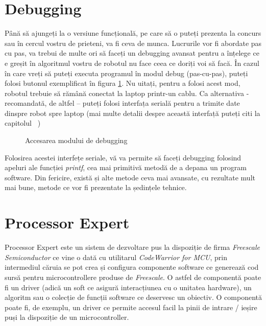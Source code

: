 \section{Debugging}

Până să ajungeți la o versiune funcțională, pe care să o puteți prezenta la concurs sau în cercul vostru de prieteni, va fi ceva de munca. Lucrurile vor fi abordate pas cu pas, va trebui de multe ori să faceți un debugging avansat pentru a înțelege ce e greșit în algoritmul vostru de robotul nu face ceea ce doriți voi să facă. În cazul în care vreți să puteți executa programul în modul debug (pas-cu-pas), puteți folosi butonul exemplificat în figura \ref{fig:CodeWarrior-Debugging}. Nu uitați, pentru a folosi acest mod, robotul trebuie să rămână conectat la laptop printr-un cablu. Ca alternativa - recomandată, de altfel – puteți folosi interfața serială pentru a trimite date dinspre robot spre laptop (mai multe detalii despre această interfață puteți citi la capitolul \textit{~})

\begin{figure}
    \vspace{-20pt}
    \vspace{-25pt}
    \caption{\label{fig:CodeWarrior-Debugging} Accesarea modului de debugging}
    \vspace{-20pt}
\end{figure}

Folosirea acestei interfețe seriale, vă va permite să faceți debugging folosind apeluri ale funcției \textit{printf}, cea mai primitivă metodă de a depana un program software. Din fericire, există și alte metode ceva mai avansate, cu rezultate mult mai bune, metode ce vor fi prezentate la ședințele tehnice.

\section{Processor Expert}

Processor Expert este un sistem de dezvoltare pus la dispoziție de firma \textit{Freescale Semiconductor} ce vine o dată cu utilitarul \textit{CodeWarrior for MCU}, prin intermediul căruia se pot crea și configura componente software ce generează cod sursă pentru microcontrollere produse de \textit{Freescale}. O astfel de componentă poate fi un driver (adică un soft ce asigură interacțiunea cu o unitatea hardware), un algoritm sau o colecție de funcții software ce deservesc un obiectiv. O componentă poate fi, de exemplu, un driver ce permite accesul facil la pinii de intrare / ieșire puși la dispoziție de un microcontroller.

